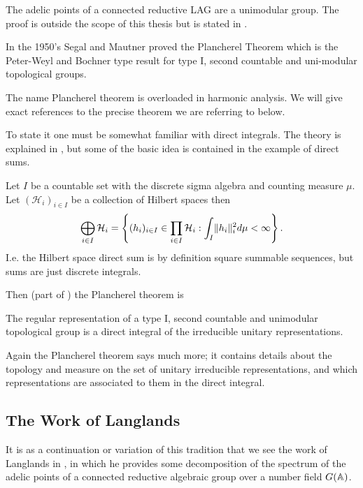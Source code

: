 \begin{example}
	The adelic points of a connected reductive LAG are a unimodular group. The proof is outside the scope of this thesis but is stated in \cite[Lem. 2]{conradCOMPACTNESSVOLUMEADELIC}.
\end{example}

In the 1950's Segal and Mautner proved the Plancherel Theorem which is the Peter-Weyl and Bochner type result for type I, second countable and uni-modular topological groups.
\begin{remark}
	The name Plancherel theorem is overloaded in harmonic analysis. We will give exact references to the precise theorem we are referring to below.
\end{remark}
 To state it one must be somewhat familiar with direct integrals. The theory is explained in \cite[7.4]{follandCourseAbstractHarmonic2016a}, but some of the basic idea is contained in the example of direct sums.
\begin{example}
	Let \(I\) be a countable set with the discrete sigma algebra and counting measure \(\mu\). Let \((\mathcal{H}_i)_{i\in I}\) be a collection of Hilbert spaces then
	\[\bigoplus_{i\in I} \mathcal{H}_i = \left\{ (h_i)_{i\in I}\in \prod_{i\in I} \mathcal{H}_i : \int_I \lVert h_i \rVert_i^2 d\mu <\infty \right\}.\]
	I.e. the Hilbert space direct sum is by definition square summable sequences, but sums are just discrete integrals.
\end{example}
Then (part of ) the Plancherel theorem is
\begin{Theorem}
	The regular representation of a type I, second countable and unimodular topological group is a direct integral of the irreducible unitary representations. 
\end{Theorem}
\begin{remark}
	Again the Plancherel theorem says much more; it contains details about the topology and measure on the set of unitary irreducible representations, and which representations are associated to them in the direct integral.
\end{remark}

\subsection{The Work of Langlands}
It is as a continuation or variation of this tradition that we see the work of Langlands in \cite{langlandsFunctionalEquationsSatisfied1976}, in which he provides some decomposition of the spectrum of the adelic points of a connected reductive algebraic group over a number field \(G(\A)\).

